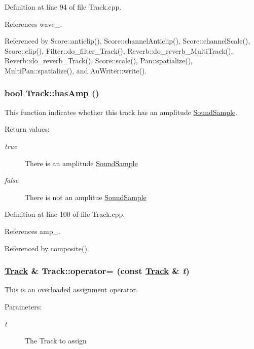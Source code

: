Definition at line 94 of file Track.cpp.

References wave\_\-.

Referenced by Score::anticlip(), Score::channel\-Anticlip(), Score::channel\-Scale(), Score::clip(), Filter::do\_\-filter\_\-Track(), Reverb::do\_\-reverb\_\-Multi\-Track(), Reverb::do\_\-reverb\_\-Track(), Score::scale(), Pan::spatialize(), Multi\-Pan::spatialize(), and Au\-Writer::write().\hypertarget{classTrack_a6}{
\subsubsection[hasAmp]{\setlength{\rightskip}{0pt plus 5cm}bool Track::has\-Amp ()}}
\label{classTrack_a6}


This function indicates whether this track has an amplitude \hyperlink{classSoundSample}{Sound\-Sample}. \begin{Desc}
\item[Return values:]
\begin{description}
\item[{\em true}]There is an amplitude \hyperlink{classSoundSample}{Sound\-Sample} \item[{\em false}]There is not an amplitue \hyperlink{classSoundSample}{Sound\-Sample} \end{description}
\end{Desc}


Definition at line 100 of file Track.cpp.

References amp\_\-.

Referenced by composite().\hypertarget{classTrack_a3}{
\subsubsection[operator=]{\setlength{\rightskip}{0pt plus 5cm}\hyperlink{classTrack}{Track} \& Track::operator= (const \hyperlink{classTrack}{Track} \& {\em t})}}
\label{classTrack_a3}


This is an overloaded assignment operator. \begin{Desc}
\item[Parameters:]
\begin{description}
\item[{\em t}]The Track to assign \end{description}
\end{Desc}


